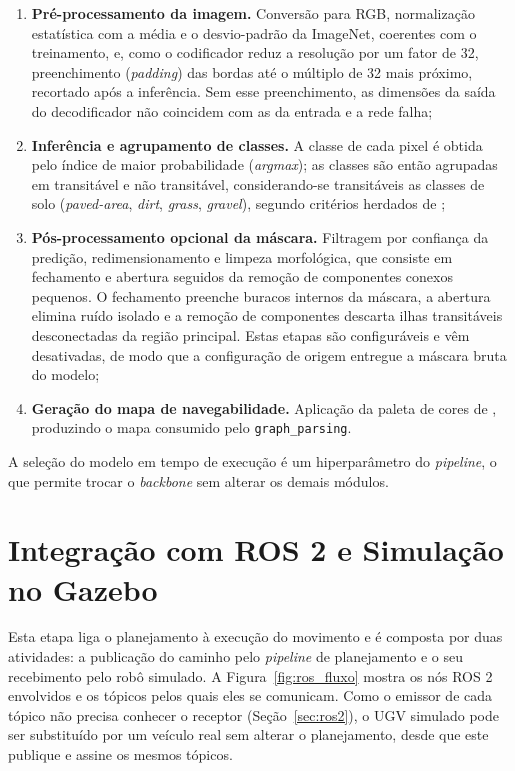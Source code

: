 \documentclass[
    12pt,
    openright,
    oneside,
    a4paper,
    english,
    brazil
]{abntex2}
\begin{document}
\begin{enumerate}
    \item \textbf{Pré-processamento da imagem.} Conversão para RGB, normalização estatística com a média e o desvio-padrão da ImageNet, coerentes com o treinamento, e, como o codificador reduz a resolução por um fator de 32, preenchimento (\textit{padding}) das bordas até o múltiplo de 32 mais próximo, recortado após a inferência. Sem esse preenchimento, as dimensões da saída do decodificador não coincidem com as da entrada e a rede falha;
    \item \textbf{Inferência e agrupamento de classes.} A classe de cada pixel é obtida pelo índice de maior probabilidade (\textit{argmax}); as classes são então agrupadas em transitável e não transitável, considerando-se transitáveis as classes de solo (\textit{paved-area}, \textit{dirt}, \textit{grass}, \textit{gravel}), segundo critérios herdados de \cite{junior2024};
    \item \textbf{Pós-processamento opcional da máscara.} Filtragem por confiança da predição, redimensionamento e limpeza morfológica, que consiste em fechamento e abertura seguidos da remoção de componentes conexos pequenos. O fechamento preenche buracos internos da máscara, a abertura elimina ruído isolado e a remoção de componentes descarta ilhas transitáveis desconectadas da região principal. Estas etapas são configuráveis e vêm desativadas, de modo que a configuração de origem entregue a máscara bruta do modelo;
    \item \textbf{Geração do mapa de navegabilidade.} Aplicação da paleta de cores de \cite{junior2025_rrt}, produzindo o mapa consumido pelo \texttt{graph\_\allowbreak{}parsing}.
\end{enumerate}

A seleção do modelo em tempo de execução é um hiperparâmetro do \textit{pipeline}, o que permite trocar o \textit{backbone} sem alterar os demais módulos.

\section{Integração com ROS 2 e Simulação no Gazebo}
\label{sec:ros_integracao}

Esta etapa liga o planejamento à execução do movimento e é composta por duas atividades: a publicação do caminho pelo \textit{pipeline} de planejamento e o seu recebimento pelo robô simulado. A Figura~\ref{fig:ros_fluxo} mostra os nós ROS 2 envolvidos e os tópicos pelos quais eles se comunicam. Como o emissor de cada tópico não precisa conhecer o receptor (Seção~\ref{sec:ros2}), o UGV simulado pode ser substituído por um veículo real sem alterar o planejamento, desde que este publique e assine os mesmos tópicos.
\end{document}
